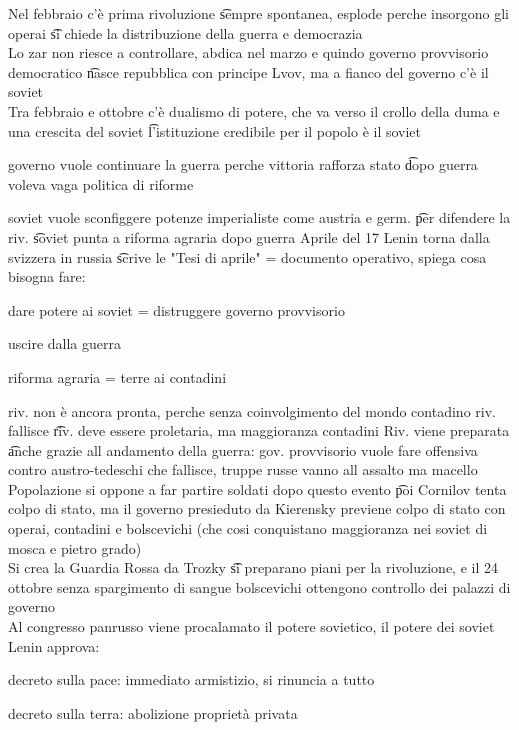 \documentclass[12pt]{article}
\begin{document}
\sss[1907]
Nel febbraio c'è prima rivoluzione \t sempre spontanea, esplode perche insorgono gli operai \t si chiede la distribuzione della guerra e democrazia \\
Lo zar non riesce a controllare, abdica nel marzo e quindo governo provvisorio democratico \t nasce repubblica con principe Lvov, ma a fianco del governo c'è il soviet \\
Tra febbraio e ottobre c'è dualismo di potere, che va verso il crollo della duma e una crescita del soviet \t l'istituzione credibile per il popolo è il soviet
\bi
  \item governo vuole continuare la guerra perche vittoria rafforza stato \t dopo guerra voleva vaga politica di riforme
  \item soviet vuole sconfiggere potenze imperialiste come austria e germ. \t per difendere la riv. \t soviet punta a riforma agraria dopo guerra
\ei
Aprile del 17 Lenin torna dalla svizzera in russia \t scrive le "Tesi di aprile" = documento operativo, spiega cosa bisogna fare:
\bi
  \item dare potere ai soviet = distruggere governo provvisorio
  \item uscire dalla guerra 
  \item riforma agraria = terre ai contadini
  \item riv. non è ancora pronta, perche senza coinvolgimento del mondo contadino riv. fallisce \t riv. deve essere proletaria, ma maggioranza contadini
\ei
Riv. viene preparata \t anche grazie all andamento della guerra: gov. provvisorio vuole fare offensiva contro austro-tedeschi che fallisce, truppe russe vanno all assalto ma macello \\
Popolazione si oppone a far partire soldati dopo questo evento \t poi Cornilov tenta colpo di stato, ma il governo presieduto da Kierensky previene colpo di stato con operai, contadini e bolscevichi (che cosi conquistano maggioranza nei soviet di mosca e pietro grado) \\
Si crea la Guardia Rossa da Trozky \t si preparano piani per la rivoluzione, e il 24 ottobre senza spargimento di sangue bolscevichi ottengono controllo dei palazzi di governo \\
Al congresso panrusso viene procalamato il potere sovietico, il potere dei soviet \\
Lenin approva:
\bi
  \item decreto sulla pace: immediato armistizio, si rinuncia a tutto
  \item decreto sulla terra: abolizione proprietà privata
\end{document}
